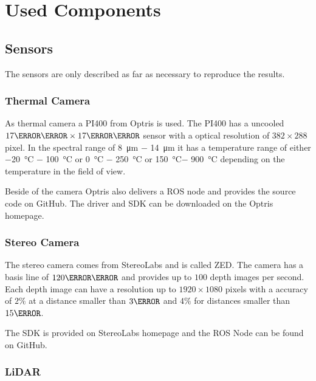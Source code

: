 \chapter{Used Components}\label{ch:usedComponents}
\section{Sensors}\label{sec:sensors}

The sensors are only described as far as necessary to reproduce the results.

\subsection{Thermal Camera}\label{ssec:HWthermalCamera}

As thermal camera a PI400 from Optris is used.
The PI400 has a uncooled $17\micro\meter \times 17\micro\meter$ sensor with a optical resolution of $382 \times 288$ pixel.
In the spectral range of \SI{8}{\micro\meter} $-$ \SI{14}{\micro\meter} it has a temperature range of either \SI{-20}{\celsius} $-$ \SI{100}{\celsius} or \SI{0}{\celsius} $-$ \SI{250}{\celsius} or \SI{150}{\celsius}$-$ \SI{900}{\celsius} depending on the temperature in the field of view\cite{PI400}.

Beside of the camera Optris also delivers a ROS node and provides the source code on GitHub\cite{OptrisROSNode}.
The driver and \ac{SDK} can be downloaded on the Optris homepage.

\subsection{Stereo Camera}\label{ssec:HWstereoCamera}

The stereo camera comes from StereoLabs and is called ZED.
The camera has a basis line of $120\milli\meter$ and provides up to $100$ depth images per second.
Each depth image can have a resolution up to $1920 \times 1080$ pixels with a accuracy of $2\percent$ at a distance smaller than $3\meter$ and $4\percent$ for distances smaller than $15\meter$\cite{ZED}.

The \ac{SDK} is provided on StereoLabs homepage and the ROS Node can be found on GitHub\cite{ZEDROSNode}.

\subsection{LiDAR}\label{ssec:HWLiDAR}

